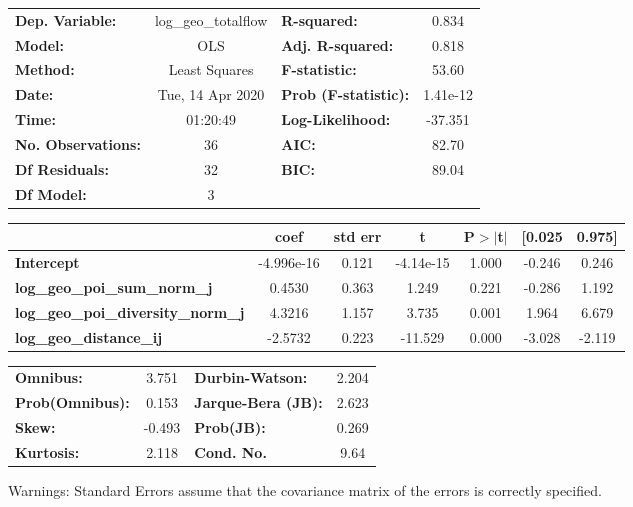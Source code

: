 \begin{center}
\begin{tabular}{lclc}
\toprule
\textbf{Dep. Variable:}                    & log\_geo\_totalflow & \textbf{  R-squared:         } &     0.834   \\
\textbf{Model:}                            &         OLS         & \textbf{  Adj. R-squared:    } &     0.818   \\
\textbf{Method:}                           &    Least Squares    & \textbf{  F-statistic:       } &     53.60   \\
\textbf{Date:}                             &   Tue, 14 Apr 2020  & \textbf{  Prob (F-statistic):} &  1.41e-12   \\
\textbf{Time:}                             &       01:20:49      & \textbf{  Log-Likelihood:    } &   -37.351   \\
\textbf{No. Observations:}                 &            36       & \textbf{  AIC:               } &     82.70   \\
\textbf{Df Residuals:}                     &            32       & \textbf{  BIC:               } &     89.04   \\
\textbf{Df Model:}                         &             3       & \textbf{                     } &             \\
\bottomrule
\end{tabular}
\begin{tabular}{lcccccc}
                                           & \textbf{coef} & \textbf{std err} & \textbf{t} & \textbf{P$> |$t$|$} & \textbf{[0.025} & \textbf{0.975]}  \\
\midrule
\textbf{Intercept}                         &   -4.996e-16  &        0.121     & -4.14e-15  &         1.000        &       -0.246    &        0.246     \\
\textbf{log\_geo\_poi\_sum\_norm\_j}       &       0.4530  &        0.363     &     1.249  &         0.221        &       -0.286    &        1.192     \\
\textbf{log\_geo\_poi\_diversity\_norm\_j} &       4.3216  &        1.157     &     3.735  &         0.001        &        1.964    &        6.679     \\
\textbf{log\_geo\_distance\_ij}            &      -2.5732  &        0.223     &   -11.529  &         0.000        &       -3.028    &       -2.119     \\
\bottomrule
\end{tabular}
\begin{tabular}{lclc}
\textbf{Omnibus:}       &  3.751 & \textbf{  Durbin-Watson:     } &    2.204  \\
\textbf{Prob(Omnibus):} &  0.153 & \textbf{  Jarque-Bera (JB):  } &    2.623  \\
\textbf{Skew:}          & -0.493 & \textbf{  Prob(JB):          } &    0.269  \\
\textbf{Kurtosis:}      &  2.118 & \textbf{  Cond. No.          } &     9.64  \\
\bottomrule
\end{tabular}
\end{center}

Warnings: \newline
 [1] Standard Errors assume that the covariance matrix of the errors is correctly specified.